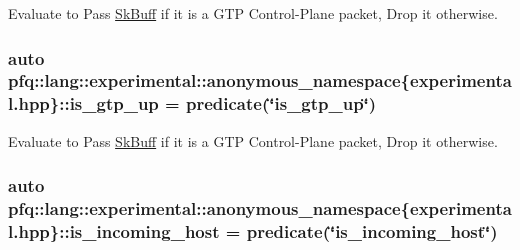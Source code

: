 Evaluate to {\ttfamily Pass} \hyperlink{structpfq_1_1lang_1_1SkBuff}{Sk\+Buff} if it is a G\+TP Control-\/\+Plane packet, {\ttfamily Drop} it otherwise. 

\subsubsection[{\texorpdfstring{is\+\_\+gtp\+\_\+up}{is_gtp_up}}]{\setlength{\rightskip}{0pt plus 5cm}auto pfq\+::lang\+::experimental\+::anonymous\+\_\+namespace\{experimental.\+hpp\}\+::is\+\_\+gtp\+\_\+up = {\bf predicate}(\char`\"{}is\+\_\+gtp\+\_\+up\char`\"{})}\hypertarget{namespacepfq_1_1lang_1_1experimental_1_1anonymous__namespace_02experimental_8hpp_03_a8c12f3cb8c8faaab619e0feb874ed0c3}{}\label{namespacepfq_1_1lang_1_1experimental_1_1anonymous__namespace_02experimental_8hpp_03_a8c12f3cb8c8faaab619e0feb874ed0c3}


Evaluate to {\ttfamily Pass} \hyperlink{structpfq_1_1lang_1_1SkBuff}{Sk\+Buff} if it is a G\+TP Control-\/\+Plane packet, {\ttfamily Drop} it otherwise. 

\subsubsection[{\texorpdfstring{is\+\_\+incoming\+\_\+host}{is_incoming_host}}]{\setlength{\rightskip}{0pt plus 5cm}auto pfq\+::lang\+::experimental\+::anonymous\+\_\+namespace\{experimental.\+hpp\}\+::is\+\_\+incoming\+\_\+host = {\bf predicate}(\char`\"{}is\+\_\+incoming\+\_\+host\char`\"{})}\hypertarget{namespacepfq_1_1lang_1_1experimental_1_1anonymous__namespace_02experimental_8hpp_03_aa75d253ac688edcdbfc80160eba5678e}{}\label{namespacepfq_1_1lang_1_1experimental_1_1anonymous__namespace_02experimental_8hpp_03_aa75d253ac688edcdbfc80160eba5678e}



